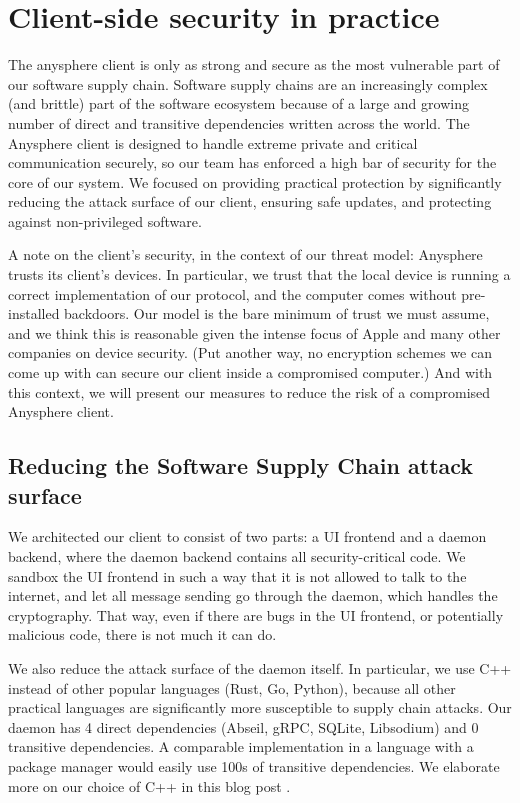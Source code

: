 \section{Client-side security in practice}

The anysphere client is only as strong and secure as the most vulnerable part of our software supply chain. Software supply chains are an increasingly complex (and brittle) part of the software ecosystem because of a large and growing number of direct and transitive dependencies written across the world. 
The Anysphere client is designed to handle extreme private and critical communication securely, so our team has enforced a high bar of security for the core of our system. We focused on providing practical protection by significantly reducing the attack surface of our client, ensuring safe updates, and protecting against non-privileged software. 

A note on the client's security, in the context of our threat model: Anysphere trusts its client's devices. 
In particular, we trust that the local device is running a correct implementation of our protocol, and the computer comes without pre-installed backdoors. 
Our model is the bare minimum of trust we must assume, and we think this is reasonable given the intense focus of Apple and many other companies on device security. 
(Put another way, no encryption schemes we can come up with can secure our client inside a compromised computer.)
And with this context, we will present our measures to reduce the risk of a compromised Anysphere client.

\subsection{Reducing the Software Supply Chain attack surface}

We architected our client to consist of two parts: a UI frontend and a daemon backend, where the daemon backend contains all security-critical code. We sandbox the UI frontend in such a way that it is not allowed to talk to the internet, and let all message sending go through the daemon, which handles the cryptography. That way, even if there are bugs in the UI frontend, or potentially malicious code, there is not much it can do.


We also reduce the attack surface of the daemon itself. In particular, we use C++ instead of other popular languages (Rust, Go, Python), because all other practical languages are significantly more susceptible to supply chain attacks. Our daemon has 4 direct dependencies (Abseil, gRPC, SQLite, Libsodium) and 0 transitive dependencies. A comparable implementation in a language with a package manager would easily use 100s of transitive dependencies. We elaborate more on our choice of C++ in this blog post .

